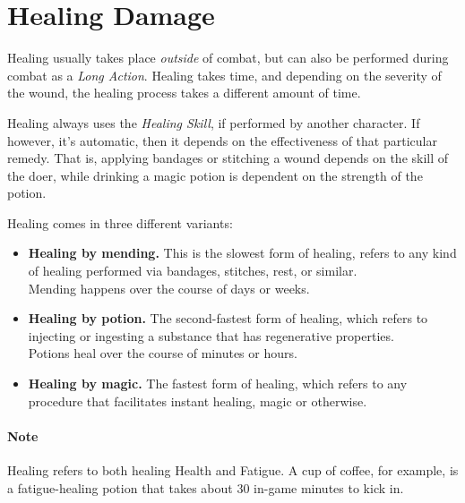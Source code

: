 \section{Healing Damage}
Healing usually takes place \textit{outside} of combat, but can also be performed during combat as a \textit{Long Action}.
Healing takes time, and depending on the severity of the wound, the healing process takes a different amount of time.

Healing always uses the \textit{Healing Skill}, if performed by another character.
If however, it's automatic, then it depends on the effectiveness of that particular remedy.
That is, applying bandages or stitching a wound depends on the skill of the doer, while drinking a magic potion is dependent on the strength of the potion.

Healing comes in three different variants:

\begin{center}
  \begin{itemize}
  \item \textbf{Healing by mending.}
    This is the slowest form of healing, refers to any kind of healing performed via bandages, stitches, rest, or similar.\\
    Mending happens over the course of days or weeks.
  \item \textbf{Healing by potion.}
    The second-fastest form of healing, which refers to injecting or ingesting a substance that has regenerative properties. \\
    Potions heal over the course of minutes or hours.
  \item \textbf{Healing by magic.}
    The fastest form of healing, which refers to any procedure that facilitates instant healing, magic or otherwise.
  \end{itemize}
\end{center}

\paragraph{Note} Healing refers to both healing Health and Fatigue.
A cup of coffee, for example, is a fatigue-healing potion that takes about 30 in-game minutes to kick in.
